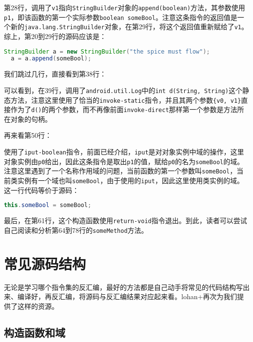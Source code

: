 
第28行，调用了\lstinline!v1!指向\lstinline!StringBuilder!对象的\lstinline!append(boolean)!方法，其参数使用\lstinline!p1!，即该函数的第一个实际参数\lstinline!boolean someBool!。注意这条指令的返回值是一个新的\lstinline!java.lang.StringBuilder!对象，在第29行，将这个返回值重新赋给了\lstinline!v1!。综上，第20到29行的源码应该是：

\begin{lstlisting}[language=java, numbers=none]
  StringBuilder a = new StringBuilder("the spice must flow");
  a = a.append(someBool);
\end{lstlisting}

我们跳过几行，直接看到第38行：


可以看到，在39行，调用了\lstinline!android.util.Log!中的\lstinline!int d(String, String)!这个静态方法，注意这里使用了恰当的\lstinline!invoke-static!指令，并且其两个参数\lstinline!{v0, v1}!直接作为了\lstinline!d()!的两个参数，而不再像前面\lstinline!invoke-direct!那样第一个参数是方法所在对象的句柄。

再来看第50行：

使用了\lstinline!iput-boolean!指令，前面已经介绍，\lstinline!iput!是对对象实例中域的操作，这里对象实例由\lstinline!p0!给出，因此这条指令是取出\lstinline!p1!的值，赋给\lstinline!p0!的名为\lstinline!someBool!的域。注意这里遇到了一个名称作用域的问题，当前函数的第一个参数叫\lstinline!someBool!，当前类实例有一个域也叫\lstinline!someBool!，由于使用的\lstinline!iput!，因此这里使用类实例的域。这一行代码等价于源码：
\begin{lstlisting}[language=java, numbers=none]
  this.someBool = someBool;
\end{lstlisting}

最后，在第61行，这个构造函数使用\lstinline!return-void!指令退出。到此，读者可以尝试自己阅读和分析第64到78行的\lstinline!someMethod!方法。

\section{常见源码结构}
无论是学习哪个指令集的反汇编，最好的方法都是自己动手将常见的代码结构写出来、编译好，再反汇编，将源码与反汇编结果对应起来看。lohan+再次为我们提供了这样的资源。

\subsection{构造函数和域}



